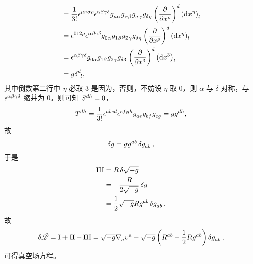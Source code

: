 \begin{Proof}
\begin{equation}
\begin{split}
					&= \frac{1}{3!} \tensor{\nvol}{^\mu^\nu^\sigma^\rho} \tensor{\nvol}{^\alpha^\beta^\gamma^\delta} \tensor{g}{_\mu_\alpha} \tensor{g}{_\nu_\beta} \tensor{g}{_\sigma_\gamma} \tensor{g}{_\delta_\eta} \tensor{\left( \pdv{x^\rho} \right)}{^d} \tensor{\left( \dd{x^\eta} \right)}{_l}\\
					&= \tensor{\nvol}{^0^1^2^\rho} \tensor{\nvol}{^\alpha^\beta^\gamma^\delta} \tensor{g}{_0_\alpha} \tensor{g}{_1_\beta} \tensor{g}{_2_\gamma} \tensor{g}{_\delta_\eta} \tensor{\left( \pdv{x^\rho} \right)}{^d} \tensor{\left( \dd{x^\eta} \right)}{_l}\\
					&= \tensor{\nvol}{^\alpha^\beta^\gamma^\delta} \tensor{g}{_0_\alpha} \tensor{g}{_1_\beta} \tensor{g}{_2_\gamma} \tensor{g}{_\delta_3} \tensor{\left( \pdv{x^3} \right)}{^d} \tensor{\left( \dd{x^3} \right)}{_l}\\
					&= g\tensor{\delta}{^d_l},
				\end{split}
			\end{equation}
			其中倒数第二行中 $\eta$ 必取 $3$ 是因为，否则，不妨设 $\eta$ 取 $0$，则 $\alpha$ 与 $\delta$ 对称，与 $\tensor{\nvol}{^\alpha^\beta^\gamma^\delta}$ 缩并为 $0$。则可知 $\tensor{S}{^d^h}=0$，
			\begin{equation}
				\tensor{T}{^d^h} = \frac{1}{3!} \tensor{\nvol}{^a^b^c^d} \tensor{\nvol}{^e^f^g^h} \tensor{g}{_a_e} \tensor{g}{_b_f} \tensor{g}{_c_g} = g \tensor{g}{^d^h},
			\end{equation}
			故
			\begin{equation}
				\var{g} = g \tensor{g}{^a^b} \var{\tensor{g}{_a_b}},
			\end{equation}
			于是
			\begin{equation}
				\begin{split}
					\RomanNumeralCaps{3} &= R \var{\sqrt{-g}}\\
					&= - \frac{R}{2\sqrt{-g}} \var{g}\\
					&= \frac{1}{2} \sqrt{-g} R \tensor{g}{^a^b} \var{\tensor{g}{_a_b}},
				\end{split}
			\end{equation}
			故
			\begin{equation}
				\var{\Lad} = \RomanNumeralCaps{1} + \RomanNumeralCaps{2} + \RomanNumeralCaps{3} = \sqrt{-g} \Nabla{a} \tensor{v}{^a} - \sqrt{-g} \left( \tensor{R}{^a^b} - \frac{1}{2} R \tensor{g}{^a^b} \right) \var{\tensor{g}{_a_b}},
			\end{equation}
			可得真空场方程。
		\end{Proof}
